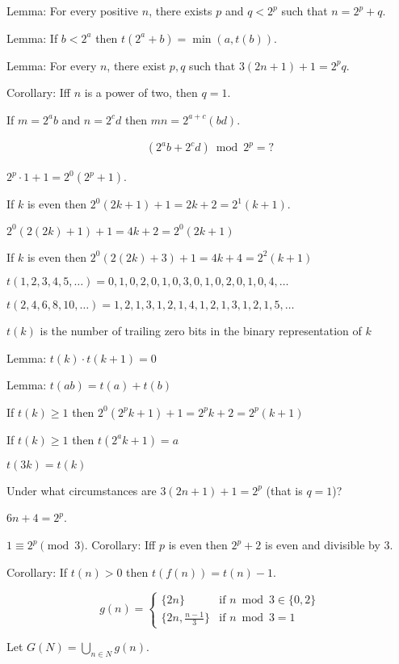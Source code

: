 Lemma:
For every positive \(n\), there exists \(p\) and \(q < 2^p\) such that \(n = 2^p + q\).

Lemma: If \(b < 2^a\) then \(t(2^a + b) = \min(a,t(b))\).

Lemma: For every \(n\), there exist \(p,q\) such that \(3(2n+1)+1 = 2^p q\).

Corollary: Iff \(n\) is a power of two, then \(q = 1\).

If \(m = 2^a b\) and \(n = 2^c d\) then \(mn = 2^{a+c} (bd)\).

\begin{align*}
    (2^a b + 2^c d) \bmod 2^p = ?
\end{align*}

\(2^p \cdot 1 + 1 = 2^0 (2^p + 1)\).

If \(k\) is even then \(2^0 (2k + 1) + 1 = 2k + 2 = 2^1 (k+1)\).

\(2^0 (2(2k) + 1) + 1 = 4k+2 = 2^0(2k+1)\)

If \(k\) is even then \(2^0 (2(2k) + 3) + 1 = 4k+4 = 2^2(k+1)\)

\(t(1,2,3,4,5,\ldots) = 0,1,0,2,0,1,0,3,0,1,0,2,0,1,0,4,\ldots\)

\(t(2,4,6,8,10,\ldots) = 1,2,1,3,1,2,1,4,1,2,1,3,1,2,1,5,\ldots\)

\(t(k)\) is the number of trailing zero bits in the binary representation of \(k\)

Lemma: \(t(k) \cdot t(k+1) = 0\)

Lemma: \(t(ab) = t(a) + t(b)\)

If \(t(k) \ge 1\) then \(2^0 (2^p k+1) + 1 = 2^p k + 2 = 2^p (k+1)\)

If \(t(k) \ge 1\) then \(t(2^a k+1) = a\)

\(t(3k) = t(k)\)

Under what circumstances are \(3(2n+1)+1 = 2^p\) (that is \(q=1\))?

\(6n+4 = 2^p\).

\(1 \equiv 2^p \pmod 3\).
Corollary: Iff \(p\) is even then \(2^p+2\) is even and divisible by 3.

Corollary: If \(t(n) > 0\) then \(t(f(n)) = t(n)-1\).

\[
    g(n) =
    \begin{cases}
        \{2n\} & \text{if } n \bmod 3 \in \{0,2\}
        \\
        \{2n, \frac{n-1}{3}\} & \text{if } n \bmod 3 = 1
    \end{cases}
\]

Let \(G(N) = \bigcup_{n \in N} g(n)\).

